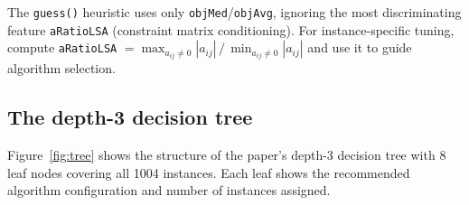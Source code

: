\documentclass[11pt,a4paper]{article}
\begin{document}
\begin{warnbox}
  The \texttt{guess()} heuristic uses only \texttt{objMed}/\texttt{objAvg}, ignoring
  the most discriminating feature \texttt{aRatioLSA} (constraint matrix conditioning).
  For instance-specific tuning, compute \texttt{aRatioLSA}
  $= \max_{a_{ij}\neq 0}|a_{ij}| \,/\, \min_{a_{ij}\neq 0}|a_{ij}|$
  and use it to guide algorithm selection.
\end{warnbox}

\subsection{The depth-3 decision tree}

Figure~\ref{fig:tree} shows the structure of the paper's depth-3 decision tree with
8 leaf nodes covering all 1004 instances. Each leaf shows the recommended
algorithm configuration and number of instances assigned.
\end{document}
